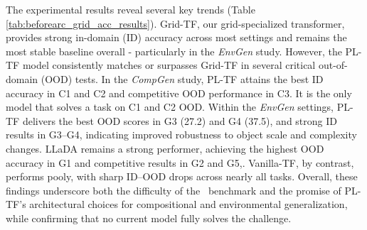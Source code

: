 


The experimental results reveal several key trends (Table \ref{tab:beforearc_grid_acc_results}).
Grid-TF, our grid-specialized transformer, provides strong in-domain (ID) accuracy across most settings and remains the most stable baseline overall - particularly in the \textit{EnvGen} study. However, the PL-TF model consistently matches or surpasses Grid-TF in several critical out-of-domain (OOD) tests. In the \textit{CompGen} study, PL-TF attains the best ID accuracy in C1 and C2 and competitive OOD performance in C3. It is the only model that solves a task on C1 and C2 OOD. Within the \textit{EnvGen} settings, PL-TF delivers the best OOD scores in G3 (27.2) and G4 (37.5), and strong ID results in G3–G4, indicating improved robustness to object scale and complexity changes. LLaDA remains a strong performer, achieving the highest OOD accuracy in G1 and competitive results in G2 and G5,. Vanilla-TF, by contrast, performs pooly, with sharp ID–OOD drops across nearly all tasks. Overall, these findings underscore both the difficulty of the \generatorName\ benchmark and the promise of PL-TF’s architectural choices for compositional and environmental generalization, while confirming that no current model fully solves the challenge.

